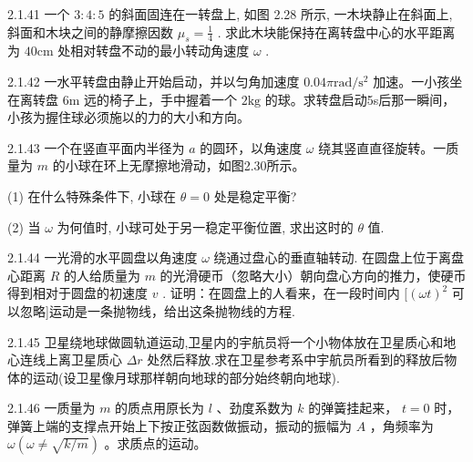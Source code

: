 \begin{problem}{2.1.41}
一个 $3:4:5$ 的斜面固连在一转盘上, 如图 2.28 所示, 一木块静止在斜面上, 斜面和木块之间的静摩擦因数 $\mu_{s} = \frac{1}{4}$ . 求此木块能保持在离转盘中心的水平距离为 $40\mathrm{cm}$ 处相对转盘不动的最小转动角速度 $\omega$ .
\begin{center}

\end{center}
\end{problem}
\clearpage


\begin{problem}{2.1.42}
一水平转盘由静止开始启动，并以匀角加速度 $0.04\pi \mathrm{rad} / \mathrm{s}^2$ 加速。一小孩坐在离转盘 $6\mathrm{m}$ 远的椅子上，手中握着一个 $2\mathrm{kg}$ 的球。求转盘启动5s后那一瞬间，小孩为握住球必须施以的力的大小和方向。
\end{problem}
\clearpage


\begin{problem}{2.1.43}
一个在竖直平面内半径为 $a$ 的圆环，以角速度 $\omega$ 绕其竖直直径旋转。一质量为 $m$ 的小球在环上无摩擦地滑动，如图2.30所示。

(1) 在什么特殊条件下, 小球在 $\theta=0$ 处是稳定平衡?

(2) 当 $\omega$ 为何值时, 小球可处于另一稳定平衡位置, 求出这时的 $\theta$ 值.
\begin{center}

\end{center}
\end{problem}
\clearpage


\begin{problem}{2.1.44}
一光滑的水平圆盘以角速度 $\omega$ 绕通过盘心的垂直轴转动. 在圆盘上位于离盘心距离 $R$ 的人给质量为 $m$ 的光滑硬币（忽略大小）朝向盘心方向的推力，使硬币得到相对于圆盘的初速度 $v$ . 证明：在圆盘上的人看来，在一段时间内 $[( \omega t)^2$ 可以忽略]运动是一条抛物线，给出这条抛物线的方程.
\end{problem}
\clearpage


\begin{problem}{2.1.45}
卫星绕地球做圆轨道运动,卫星内的宇航员将一个小物体放在卫星质心和地心连线上离卫星质心 $\Delta r$ 处然后释放.求在卫星参考系中宇航员所看到的释放后物体的运动(设卫星像月球那样朝向地球的部分始终朝向地球).
\end{problem}
\clearpage


\begin{problem}{2.1.46}
一质量为 $m$ 的质点用原长为 $l$ 、劲度系数为 $k$ 的弹簧挂起来， $t = 0$ 时，弹簧上端的支撑点开始上下按正弦函数做振动，振动的振幅为 $A$ ，角频率为 $\omega (\omega \neq \sqrt{k / m})$ 。求质点的运动。
\end{problem}
\clearpage


